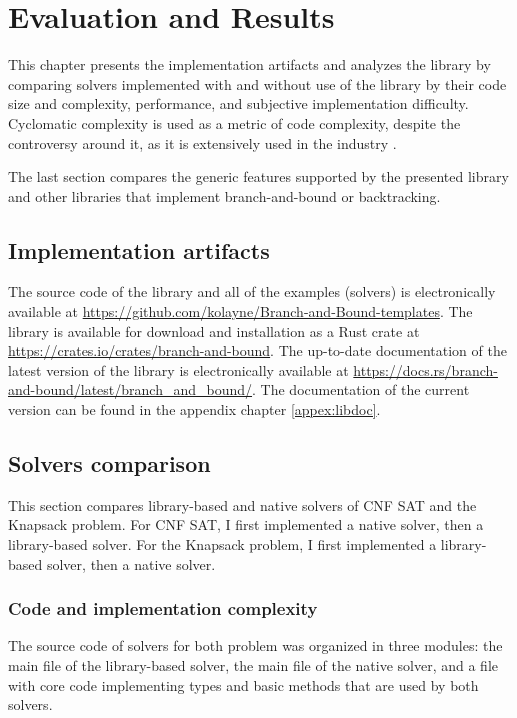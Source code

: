 \chapter{Evaluation and Results}
\label{chap:res}

This chapter presents the implementation artifacts and analyzes the library by comparing
solvers implemented with and without use of the library by their code size and
complexity, performance, and subjective implementation difficulty. Cyclomatic complexity
\cite{ebert2016cyclomatic} is used as a metric of code complexity,
despite the controversy around it, as it is extensively used in the industry
\cite{ebert2016cyclomatic}.

The last section compares the generic features supported by the presented library and
other libraries that implement branch-and-bound or backtracking.

\section{Implementation artifacts}

The source code of the library and all of the examples (solvers) is electronically
available at \url{https://github.com/kolayne/Branch-and-Bound-templates}. The library
is available for download and installation as a Rust crate at
\url{https://crates.io/crates/branch-and-bound}.
The up-to-date documentation of the latest version of the library is electronically
available at \url{https://docs.rs/branch-and-bound/latest/branch_and_bound/}.
The documentation of the current version can be found in the appendix chapter \ref{appex:libdoc}.

\section{Solvers comparison}

This section compares library-based and native solvers of CNF SAT and the Knapsack problem.
For CNF SAT, I first implemented a native solver, then a library-based
solver. For the Knapsack problem, I first implemented a library-based solver, then a
native solver.

\subsection{Code and implementation complexity}

The source code of solvers for both problem was organized in three modules:
the main file of the library-based solver, the main file of the native solver, and a file
with core code implementing types and basic methods that are used by both solvers.

